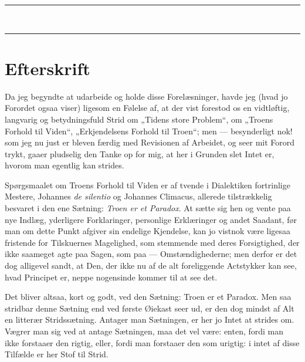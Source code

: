 \documentclass[12pt,a4paper]{book}
\newcommand{\opage}[1]{\marginnote{\footnotesize\textit{[#1]}}}
\begin{document}
\begin{center}
\rule{0.30\textwidth}{0.4pt}\\[2pt]
\rule{0.30\textwidth}{0.4pt}
\end{center}

\opage{173} \chapter*{Efterskrift}
\label{ch:efterskrift}

\begingroup\small

Da jeg begyndte at udarbeide og holde disse Forelæsninger, havde jeg (hvad jo
Forordet ogsaa viser) ligesom en Følelse af, at der vist forestod os en
vidtløftig, langvarig og betydningsfuld Strid om „Tidens store Problem“, om
„Troens Forhold til Viden“, „Erkjendelsens Forhold til Troen“; men ---
besynderligt nok! som jeg nu just er bleven færdig med Revisionen af
Arbeidet, og seer mit Forord trykt, gaaer pludselig den Tanke op for mig, at
her i Grunden slet Intet er, hvorom man egentlig kan strides.

Spørgsmaalet om Troens Forhold til Viden er af tvende i Dialektiken
fortrinlige Mestere, Johannes \textit{de silentio} og Johannes Climacus,
allerede tilstrækkelig besvaret i den ene Sætning: \emph{Troen er et
Paradox}. At sætte sig hen og vente paa nye Indlæg, yderligere Forklaringer,
personlige Erklæringer og andet Saadant, før man om dette Punkt afgiver sin
endelige Kjendelse, kan jo vistnok være ligesaa fristende for Tilskuernes
Magelighed, som stemmende med deres Forsigtighed, der ikke saameget agte paa
Sagen, som paa --- Omstændighederne; men derfor er det dog alligevel sandt,
at Den, der ikke nu af de alt foreliggende Actstykker kan see, hvad Principet
er, neppe nogensinde kommer til at see det.

Det bliver altsaa, kort og godt, ved den Sætning: Troen er et Paradox.
Men saa stridbar denne Sætning end ved første Øiekast seer ud, er den dog
mindst af Alt en litterær Stridssætning. Antager man Sætningen, er her jo
Intet at strides om. Vægrer man sig ved at antage Sætningen, maa det vel
være: enten, fordi man ikke forstaaer den rigtig, eller, fordi man forstaaer
den som urigtig: i intet af disse Tilfælde er her Stof til Strid.
\end{document}
